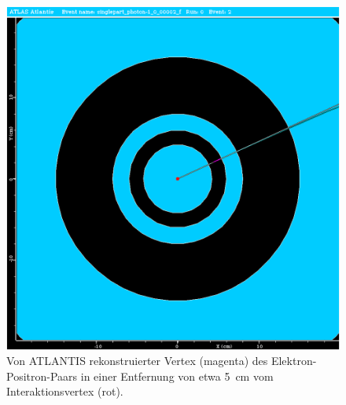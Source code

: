 \documentclass[11pt, a4paper]{article}
\numberwithin{equation}{section}
\begin{document}
\begin{figure}[htbp]
	\centering
	\includegraphics[width=1.0\textwidth]{./data/atlantis/singlepart_events_new/photons/conversion_vertex_no_fisheye.png}
	\caption{Von ATLANTIS rekonstruierter Vertex (magenta) des Elektron-Positron-Paars in einer Entfernung von etwa \SI{5}{\centi\meter} vom Interaktionsvertex (rot).}
	\label{fig:photon-vertex}
\end{figure}

\clearpage
\end{document}
